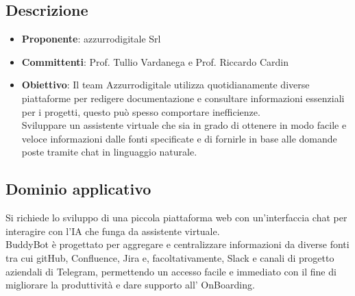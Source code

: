 \documentclass[italian, 12pt]{article}
\begin{document}
\subsection{Descrizione}
\begin{itemize}
\item\textbf{Proponente}: azzurrodigitale Srl
\item\textbf{Committenti}: Prof. Tullio Vardanega e Prof. Riccardo Cardin
\item\textbf{Obiettivo}:  Il team Azzurrodigitale utilizza quotidianamente diverse piattaforme per redigere documentazione e consultare informazioni essenziali per i progetti, questo può spesso comportare inefficienze.\\
Sviluppare un assistente virtuale che sia in grado di ottenere in modo facile e veloce informazioni dalle fonti specificate e di fornirle in base alle domande poste tramite chat in linguaggio naturale.
\end{itemize}

\subsection{Dominio applicativo}
Si richiede lo sviluppo di una piccola piattaforma web con un'interfaccia chat per interagire con l’IA che funga da assistente virtuale.\\
BuddyBot è progettato per aggregare e centralizzare informazioni da diverse fonti tra cui gitHub, Confluence, Jira e, facoltativamente, Slack e canali di progetto aziendali di Telegram, permettendo un accesso facile e immediato con il fine di migliorare la produttività e dare supporto all’ OnBoarding.
\end{document}
